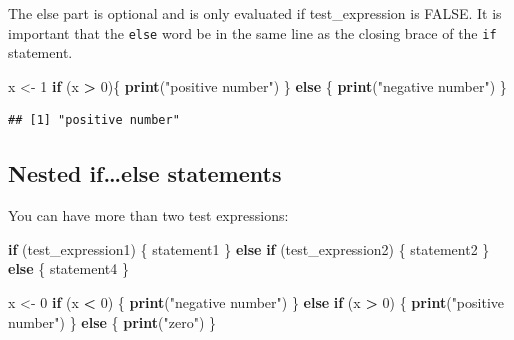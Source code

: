\documentclass[
]{book}
\newenvironment{Shaded}{\begin{snugshade}}{\end{snugshade}}
\newcommand{\ControlFlowTok}[1]{\textcolor[rgb]{0.13,0.29,0.53}{\textbf{#1}}}
\newcommand{\DecValTok}[1]{\textcolor[rgb]{0.00,0.00,0.81}{#1}}
\newcommand{\KeywordTok}[1]{\textcolor[rgb]{0.13,0.29,0.53}{\textbf{#1}}}
\newcommand{\NormalTok}[1]{#1}
\newcommand{\OperatorTok}[1]{\textcolor[rgb]{0.81,0.36,0.00}{\textbf{#1}}}
\newcommand{\StringTok}[1]{\textcolor[rgb]{0.31,0.60,0.02}{#1}}
\begin{document}
The else part is optional and is only evaluated if test\_expression is FALSE. It is important that the \texttt{else} word be in the same line as the closing brace of the \texttt{if} statement.

\begin{Shaded}
\begin{Highlighting}[]
\NormalTok{x <-}\StringTok{ }\DecValTok{1}
\ControlFlowTok{if}\NormalTok{ (x }\OperatorTok{>}\StringTok{ }\DecValTok{0}\NormalTok{)\{}
  \KeywordTok{print}\NormalTok{(}\StringTok{"positive number"}\NormalTok{)}
\NormalTok{\} }\ControlFlowTok{else}\NormalTok{ \{}
    \KeywordTok{print}\NormalTok{(}\StringTok{"negative number"}\NormalTok{)}
\NormalTok{\}}
\end{Highlighting}
\end{Shaded}

\begin{verbatim}
## [1] "positive number"
\end{verbatim}

\hypertarget{nested-ifelse-statements}{%
\subsection*{Nested if\ldots else statements}\label{nested-ifelse-statements}}

You can have more than two test expressions:

\begin{Shaded}
\begin{Highlighting}[]
\ControlFlowTok{if}\NormalTok{ (test_expression1) \{}
\NormalTok{  statement1}
\NormalTok{\} }\ControlFlowTok{else} \ControlFlowTok{if}\NormalTok{ (test_expression2) \{}
\NormalTok{    statement2}
\NormalTok{\} }\ControlFlowTok{else}\NormalTok{ \{}
\NormalTok{      statement4}
\NormalTok{\}}
\end{Highlighting}
\end{Shaded}

\begin{Shaded}
\begin{Highlighting}[]
\NormalTok{x <-}\StringTok{ }\DecValTok{0}
\ControlFlowTok{if}\NormalTok{ (x }\OperatorTok{<}\StringTok{ }\DecValTok{0}\NormalTok{) \{}
   \KeywordTok{print}\NormalTok{(}\StringTok{"negative number"}\NormalTok{)}
\NormalTok{\} }\ControlFlowTok{else} \ControlFlowTok{if}\NormalTok{ (x }\OperatorTok{>}\StringTok{ }\DecValTok{0}\NormalTok{) \{}
   \KeywordTok{print}\NormalTok{(}\StringTok{"positive number"}\NormalTok{)}
\NormalTok{\} }\ControlFlowTok{else}\NormalTok{ \{}
   \KeywordTok{print}\NormalTok{(}\StringTok{"zero"}\NormalTok{)}
\NormalTok{\}}
\end{Highlighting}
\end{Shaded}
\end{document}
